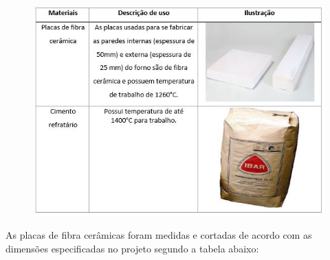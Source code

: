 \begin{figure}[H]
	\centering
	\label{res1}
	\includegraphics[keepaspectratio=true,scale=0.9]{figuras/res1.JPG}
\end{figure}

As placas de fibra cerâmicas foram medidas e cortadas de acordo com as dimensões especificadas no projeto segundo a tabela abaixo:

